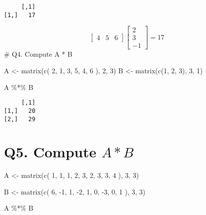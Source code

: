 \documentclass[
  letterpaper,
  DIV=11,
  numbers=noendperiod]{scrartcl}
\newenvironment{Shaded}{\begin{snugshade}}{\end{snugshade}}
\newcommand{\DecValTok}[1]{\textcolor[rgb]{0.68,0.00,0.00}{#1}}
\newcommand{\FunctionTok}[1]{\textcolor[rgb]{0.28,0.35,0.67}{#1}}
\newcommand{\NormalTok}[1]{\textcolor[rgb]{0.00,0.23,0.31}{#1}}
\newcommand{\OtherTok}[1]{\textcolor[rgb]{0.00,0.23,0.31}{#1}}
\newcommand{\SpecialCharTok}[1]{\textcolor[rgb]{0.37,0.37,0.37}{#1}}
\begin{document}
\begin{verbatim}
     [,1]
[1,]   17
\end{verbatim}

\[
\begin{bmatrix}
4 & 5 & 6
\end{bmatrix}
\begin{bmatrix}
2\\3\\-1
\end{bmatrix} =
17
\] \# Q4. Compute A * B

\begin{Shaded}
\begin{Highlighting}[]
\NormalTok{A }\OtherTok{\textless{}{-}} \FunctionTok{matrix}\NormalTok{(}\FunctionTok{c}\NormalTok{(}
  \DecValTok{2}\NormalTok{, }\DecValTok{1}\NormalTok{,}
  \DecValTok{3}\NormalTok{, }\DecValTok{5}\NormalTok{,}
  \DecValTok{4}\NormalTok{, }\DecValTok{6}
\NormalTok{), }\DecValTok{2}\NormalTok{, }\DecValTok{3}\NormalTok{)}
\NormalTok{B }\OtherTok{\textless{}{-}} \FunctionTok{matrix}\NormalTok{(}\FunctionTok{c}\NormalTok{(}\DecValTok{1}\NormalTok{, }\DecValTok{2}\NormalTok{, }\DecValTok{3}\NormalTok{), }\DecValTok{3}\NormalTok{, }\DecValTok{1}\NormalTok{)}

\NormalTok{A }\SpecialCharTok{\%*\%}\NormalTok{ B}
\end{Highlighting}
\end{Shaded}

\begin{verbatim}
     [,1]
[1,]   20
[2,]   29
\end{verbatim}

\hypertarget{q5.-compute-a-b}{%
\section{\texorpdfstring{Q5. Compute
\(A * B\)}{Q5. Compute A * B}}\label{q5.-compute-a-b}}

\begin{Shaded}
\begin{Highlighting}[]
\NormalTok{A }\OtherTok{\textless{}{-}} \FunctionTok{matrix}\NormalTok{(}\FunctionTok{c}\NormalTok{(}
  \DecValTok{1}\NormalTok{, }\DecValTok{1}\NormalTok{, }\DecValTok{1}\NormalTok{,}
  \DecValTok{2}\NormalTok{, }\DecValTok{3}\NormalTok{, }\DecValTok{2}\NormalTok{,}
  \DecValTok{3}\NormalTok{, }\DecValTok{3}\NormalTok{, }\DecValTok{4}
\NormalTok{), }\DecValTok{3}\NormalTok{, }\DecValTok{3}\NormalTok{)}

\NormalTok{B }\OtherTok{\textless{}{-}} \FunctionTok{matrix}\NormalTok{(}\FunctionTok{c}\NormalTok{(}
  \DecValTok{6}\NormalTok{, }\SpecialCharTok{{-}}\DecValTok{1}\NormalTok{, }\DecValTok{1}\NormalTok{,}
  \SpecialCharTok{{-}}\DecValTok{2}\NormalTok{, }\DecValTok{1}\NormalTok{, }\DecValTok{0}\NormalTok{,}
  \SpecialCharTok{{-}}\DecValTok{3}\NormalTok{, }\DecValTok{0}\NormalTok{, }\DecValTok{1}
\NormalTok{), }\DecValTok{3}\NormalTok{, }\DecValTok{3}\NormalTok{)}

\NormalTok{A }\SpecialCharTok{\%*\%}\NormalTok{ B}
\end{Highlighting}
\end{Shaded}
\end{document}
